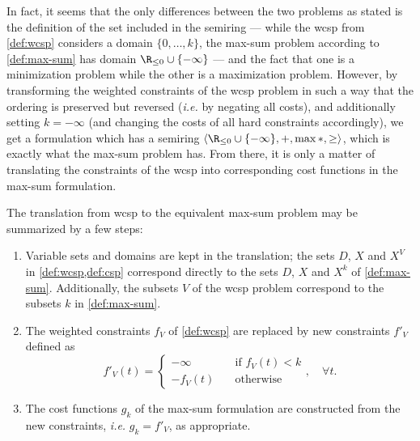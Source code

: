 In fact, it seems that the only differences between the two problems as stated is the definition of the set included in the semiring --- while the \gls{wcsp} from \cref{def:wcsp} considers a domain \(\{0,\dotsc,k\}\), the max-sum problem according to \cref{def:max-sum} has domain \(\Rminus \cup \{-\infty\}\) --- and the fact that one is a minimization problem while the other is a maximization problem.
However, by transforming the weighted constraints of the \gls{wcsp} problem in such a way that the ordering is preserved but reversed (\emph{i.e.} by negating all costs), and additionally setting \(k=-\infty\) (and changing the costs of all hard constraints accordingly), we get a formulation which has a semiring \(\langle\Rminus \cup \{-\infty\},+,\max*,\geq\rangle\), which is exactly what the max-sum problem has.
From there, it is only a matter of translating the constraints of the \gls{wcsp} into corresponding cost functions in the max-sum formulation.

The translation from \gls{wcsp} to the equivalent max-sum problem may be summarized by a few steps:
\begin{enumerate}
	\item Variable sets and domains are kept in the translation; the sets \(D\), \(X\) and \(X^V\) in \cref{def:wcsp,def:csp} correspond directly to the sets \(D\), \(X\) and \(X^k\) of \cref{def:max-sum}. Additionally, the subsets \(V\) of the \gls{wcsp} problem correspond to the subsets \(k\) in \cref{def:max-sum}.
	\item The weighted constraints \(f_V\) of \cref{def:wcsp} are replaced by new constraints \(f'_V\) defined as
	\begin{equation*}
		f'_V(t) = \begin{cases}
			-\infty &\quad \text{if \(f_V(t) < k\)} \\
			-f_V(t) &\quad \text{otherwise}
		\end{cases}, \quad \forall t.
	\end{equation*}
	\item The cost functions \(g_k\) of the max-sum formulation are constructed from the new constraints, \emph{i.e.} \(g_k = f'_V\), as appropriate.
\end{enumerate}
